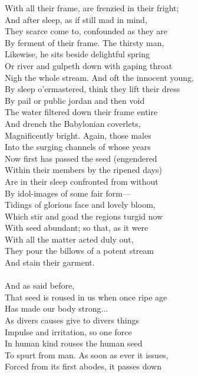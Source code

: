 With all their frame, are frenzied in their fright;\\
And after sleep, as if still mad in mind,\\
They scarce come to, confounded as they are\\
By ferment of their frame. The thirsty man,\\
Likewise, he sits beside delightful spring\\
Or river and gulpeth down with gaping throat\\
Nigh the whole stream. And oft the innocent young,\\
By sleep o'ermastered, think they lift their dress\\
By pail or public jordan and then void\\
The water filtered down their frame entire\\
And drench the Babylonian coverlets,\\
Magnificently bright. Again, those males\\
Into the surging channels of whose years\\
Now first has passed the seed (engendered\\
Within their members by the ripened days)\\
Are in their sleep confronted from without\\
By idol-images of some fair form—\\
Tidings of glorious face and lovely bloom,\\
Which stir and goad the regions turgid now\\
With seed abundant; so that, as it were\\
With all the matter acted duly out,\\
They pour the billows of a potent stream\\
And stain their garment.\\
\\
And as said before,\\
That seed is roused in us when once ripe age\\
Has made our body strong...\\
As divers causes give to divers things\\
Impulse and irritation, so one force\\
In human kind rouses the human seed\\
To spurt from man. As soon as ever it issues,\\
Forced from its first abodes, it passes down\\
